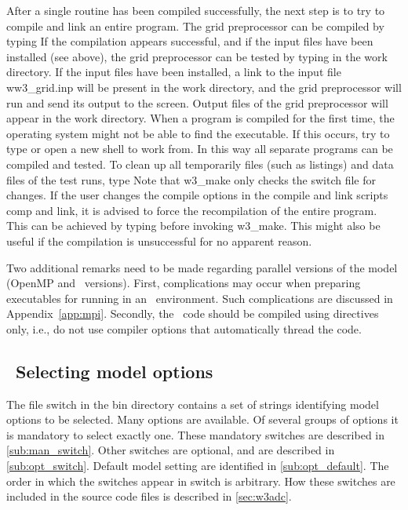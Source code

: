After a single routine has been compiled successfully, the next step is to try
to compile and link an entire program. The grid preprocessor can be compiled
by typing  If the compilation appears successful,
and if the input files have been installed (see above), the grid preprocessor
can be tested by typing  in the work directory. If the
input files have been installed, a link to the input file {\file
ww3\_grid.inp} will be present in the work directory, and the grid
preprocessor will run and send its output to the screen. Output files of the
grid preprocessor will appear in the work directory. When a program is
compiled for the first time, the operating system might not be able to find
the executable. If this occurs, try to type  or open a new
shell to work from. In this way all separate programs can be compiled and
tested. To clean up all temporarily files (such as listings) and data files of
the test runs, type  Note that {\file w3\_make} only checks
the switch file for changes. If the user changes the compile options in the
compile and link scripts {\file comp} and {\file link}, it is advised to force
the recompilation of the entire program. This can be achieved by typing
 before invoking {\file w3\_make}. This
might also be useful if the compilation is unsuccessful for no apparent
reason.

\vspace{\baselineskip} 
\noindent 
Two additional remarks need to be made regarding parallel versions of the
model (OpenMP and \mpi\ versions). First, complications may occur when
preparing executables for running in an \mpi\ environment. Such complications
are discussed in Appendix~\ref{app:mpi}. Secondly, the \omp\ code should be
compiled using directives only, i.e., do not use compiler options that
automatically thread the code.


\pb
\vssub
\subsection{~Selecting model options} \label{sec:switches}
\vssub

The file {\file switch} in the {\file bin} directory contains a set of strings
identifying model options to be selected. Many options are available. Of
several groups of options it is mandatory to select exactly one. These
mandatory switches are described in \para\ref{sub:man_switch}. Other switches
are optional, and are described in \para\ref{sub:opt_switch}. Default model
setting are identified in \para\ref{sub:opt_default}. The order in which the
switches appear in {\file switch} is arbitrary. How these switches are
included in the source code files is described in \para\ref{sec:w3adc}.


